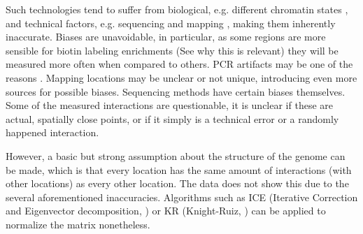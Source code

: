 Such technologies tend to suffer from biological, e.g. different chromatin
states \cite{pmid19693276}, and technical factors, e.g. sequencing and mapping
\cite{pmid21646344}, making them inherently inaccurate. Biases are unavoidable,
in particular, as some regions are more sensible for biotin labeling
enrichments (See  why this is relevant) they will be
measured more often when compared to others. PCR artifacts may be one of the
reasons \cite{wingett2015hicup}. Mapping locations may be unclear or not
unique, introducing even more sources for possible biases. Sequencing methods
have certain biases themselves. Some of the measured interactions are
questionable, it is unclear if these are actual, spatially close points, or if
it simply is a technical error or a randomly happened interaction.

However, a basic but strong assumption about the structure of the genome can be
made, which is that every location has the same amount of interactions (with
other locations) as every other location. The data does not show this due to
the several aforementioned inaccuracies. Algorithms such as ICE
\cite{imakaev2012iterative} (Iterative Correction and Eigenvector
decomposition, ) or KR \cite{knight2013fast} (Knight-Ruiz,
) can be applied to normalize the matrix nonetheless.



